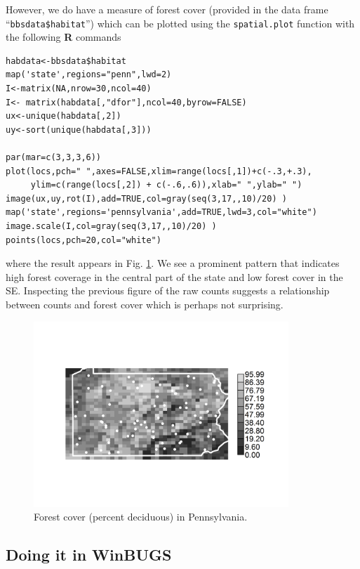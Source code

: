 However, we do have a measure of forest cover
(provided in the data frame
``\mbox{\tt bbsdata\$habitat}'') which can be plotted using the \mbox{\tt spatial.plot} function
with the following {\bf R} commands
{\small
\begin{verbatim}
habdata<-bbsdata$habitat
map('state',regions="penn",lwd=2)
I<-matrix(NA,nrow=30,ncol=40)
I<- matrix(habdata[,"dfor"],ncol=40,byrow=FALSE)
ux<-unique(habdata[,2])
uy<-sort(unique(habdata[,3]))

par(mar=c(3,3,3,6))
plot(locs,pch=" ",axes=FALSE,xlim=range(locs[,1])+c(-.3,+.3),
     ylim=c(range(locs[,2]) + c(-.6,.6)),xlab=" ",ylab=" ")
image(ux,uy,rot(I),add=TRUE,col=gray(seq(3,17,,10)/20) )
map('state',regions='pennsylvania',add=TRUE,lwd=3,col="white")
image.scale(I,col=gray(seq(3,17,,10)/20) )
points(locs,pch=20,col="white")
\end{verbatim}
}
where the result appears in Fig. \ref{glms.fig.paforest}.
We see a prominent pattern that indicates high forest coverage in the
central part of the state and low forest cover in the SE.  Inspecting
the previous figure of the raw counts suggests a relationship between
counts and forest cover which is perhaps not surprising.
\begin{figure}
\begin{center}
\includegraphics[height=2.75in]{Ch2-Bayes/figs/paforest}
\end{center}
\caption{Forest cover (percent deciduous) in Pennsylvania.}
\label{glms.fig.paforest}
\end{figure}

\subsection{Doing it in WinBUGS}

